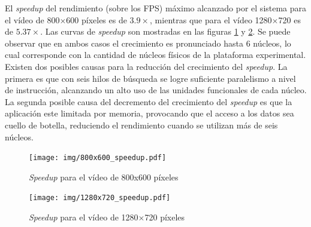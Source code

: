 El \emph{speedup} del rendimiento (sobre los FPS) máximo alcanzado por el
sistema para el vídeo de 800$\times$600 píxeles es de $3.9\times$, mientras que
para el vídeo 1280$\times$720 es de $5.37\times$. Las curvas de \emph{speedup}
son mostradas en las figuras \ref{speedUp800} y \ref{speedUp1280}. Se puede
observar que en ambos casos el crecimiento es pronunciado hasta 6 núcleos, lo
cual corresponde con la cantidad de núcleos físicos de la plataforma
experimental. Existen dos posibles causas para la reducción del crecimiento del
\emph{speedup}. La primera es que con seis hilos de búsqueda se logre suficiente
paralelismo a nivel de instrucción, alcanzando un alto uso de las unidades
funcionales de cada núcleo. La segunda posible causa del decremento del
crecimiento del \emph{speedup} es que la aplicación este limitada por memoria,
provocando que el acceso a los datos sea cuello de botella, reduciendo el
rendimiento cuando se utilizan más de seis núcleos.

\begin{figure}[h]

	\texttt{[image: img/800x600\_speedup.pdf]}
	\caption{\emph{Speedup} para el vídeo de 800x600 píxeles}
	\label{speedUp800}

\end{figure}

\begin{figure}[h]

	\texttt{[image: img/1280x720\_speedup.pdf]}
	\caption{\emph{Speedup} para el vídeo de 1280$\times$720 píxeles}
	\label{speedUp1280}

\end{figure}
